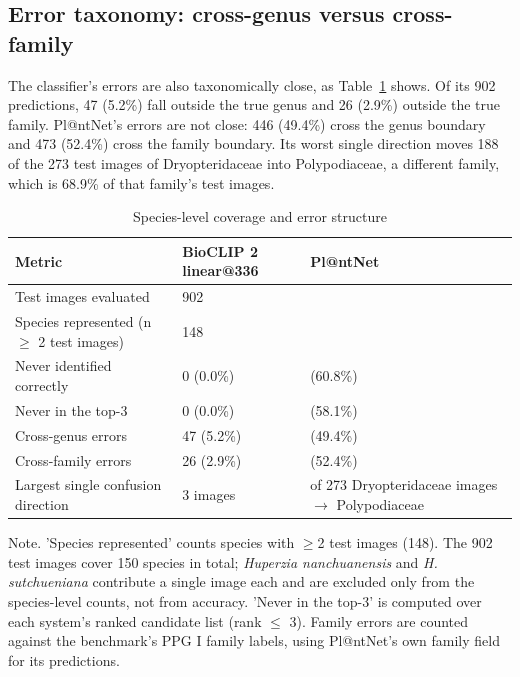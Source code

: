 \documentclass[preprint,12pt,authoryear]{elsarticle}
\begin{document}
\setcounter{section}{8}

\setcounter{subsection}{1}

\subsection{Error taxonomy: cross-genus versus cross-family}\label{sec:8.2}

The classifier's errors are also taxonomically close, as Table~\ref{tab:8} shows. Of its 902 predictions, 47 (5.2\%) fall outside the true genus and 26 (2.9\%) outside the true family. Pl@ntNet's errors are not close: 446 (49.4\%) cross the genus boundary and 473 (52.4\%) cross the family boundary. Its worst single direction moves 188 of the 273 test images of Dryopteridaceae into Polypodiaceae, a different family, which is 68.9\% of that family's test images.

\begin{table}[tbp]
\centering
\begin{threeparttable}
\caption{Species-level coverage and error structure}
\label{tab:8}
\begin{tabularx}{\linewidth}{>{\raggedright\arraybackslash\hsize=1.0\hsize}X l >{\raggedright\arraybackslash\hsize=1.0\hsize}X}
\toprule
Metric & BioCLIP 2 linear@336 & Pl@ntNet \\
\midrule
Test images evaluated & 902 & 902 \\
Species represented (n $\geq$ 2 test images) & 148 & 148 \\
Never identified correctly & 0 (0.0\%) & 90 (60.8\%) \\
Never in the top-3 & 0 (0.0\%) & 86 (58.1\%) \\
Cross-genus errors & 47 (5.2\%) & 446 (49.4\%) \\
Cross-family errors & 26 (2.9\%) & 473 (52.4\%) \\
Largest single confusion direction & 3 images & 188 of 273 Dryopteridaceae images $\rightarrow$ Polypodiaceae \\
\bottomrule
\end{tabularx}
\begin{tablenotes}\footnotesize
\item Note. 'Species represented' counts species with $\geq$2 test images (148). The 902 test images cover 150 species in total; \emph{Huperzia nanchuanensis} and \emph{H. sutchueniana} contribute a single image each and are excluded only from the species-level counts, not from accuracy. 'Never in the top-3' is computed over each system's ranked candidate list (rank $\leq$ 3). Family errors are counted against the benchmark's PPG I family labels, using Pl@ntNet's own family field for its predictions.
\end{tablenotes}
\end{threeparttable}
\end{table}
\end{document}
